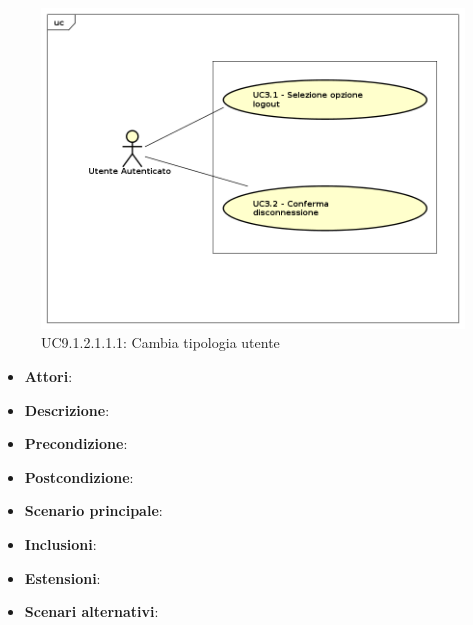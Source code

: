 						\label{UC9.1.2.1.1.1}
						\begin{figure}[h]
							\centering
						\includegraphics[scale=0.7,keepaspectratio]{UML/UC9.png}
							\caption{UC9.1.2.1.1.1: Cambia tipologia utente}
						\end{figure}
						\FloatBarrier
						\begin{itemize}
							\item \textbf{Attori}: 
							\item \textbf{Descrizione}: 
							\item \textbf{Precondizione}: 
							\item \textbf{Postcondizione}: 
							\item \textbf{Scenario principale}:
							\item \textbf{Inclusioni}:
							\item \textbf{Estensioni}:
							\item \textbf{Scenari alternativi}:
						\end{itemize}
						
